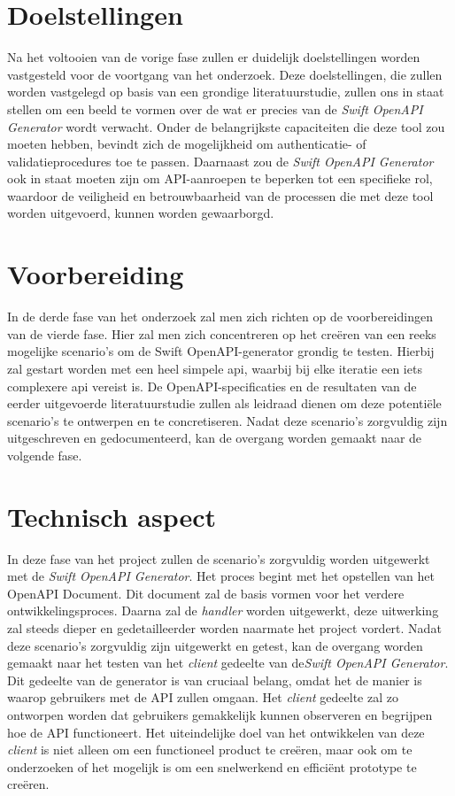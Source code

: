 \section{Doelstellingen}
Na het voltooien van de vorige fase zullen er duidelijk doelstellingen worden vastgesteld voor de voortgang van het onderzoek. Deze doelstellingen, die zullen worden vastgelegd op basis van een grondige literatuurstudie, zullen ons in staat stellen om een beeld te vormen over de wat er precies van de \textit{Swift OpenAPI Generator} wordt verwacht. Onder de belangrijkste capaciteiten die deze tool zou moeten hebben, bevindt zich de mogelijkheid om authenticatie- of validatieprocedures toe te passen. Daarnaast zou de \textit{Swift OpenAPI Generator} ook in staat moeten zijn om API-aanroepen te beperken tot een specifieke rol, waardoor de veiligheid en betrouwbaarheid van de processen die met deze tool worden uitgevoerd, kunnen worden gewaarborgd.

\section{Voorbereiding}
In de derde fase van het onderzoek zal men zich richten op de voorbereidingen van de vierde fase. Hier zal men zich concentreren op het creëren van een reeks mogelijke scenario's om de Swift OpenAPI-generator grondig te testen. Hierbij zal gestart worden met een heel simpele api, waarbij bij elke iteratie een iets complexere api vereist is. De OpenAPI-specificaties en de resultaten van de eerder uitgevoerde literatuurstudie zullen als leidraad dienen om deze potentiële scenario's te ontwerpen en te concretiseren. Nadat deze scenario’s zorgvuldig zijn uitgeschreven en gedocumenteerd, kan de overgang worden gemaakt naar de volgende fase. 

\section{Technisch aspect}
In deze fase van het project zullen de scenario's zorgvuldig worden uitgewerkt met de \textit{Swift OpenAPI Generator}. Het proces begint met het opstellen van het OpenAPI Document. Dit document zal de basis vormen voor het verdere ontwikkelingsproces. Daarna zal de \textit{handler} worden uitgewerkt, deze uitwerking zal steeds dieper en gedetailleerder worden naarmate het project vordert.
Nadat deze scenario's zorgvuldig zijn uitgewerkt en getest, kan de overgang worden gemaakt naar het testen van het \textit{client} gedeelte van de\textit{Swift OpenAPI Generator}. Dit gedeelte van de generator is van cruciaal belang, omdat het de manier is waarop gebruikers met de API zullen omgaan. Het \textit{client} gedeelte zal zo ontworpen worden dat gebruikers gemakkelijk kunnen observeren en begrijpen hoe de API functioneert.
Het uiteindelijke doel van het ontwikkelen van deze \textit{client} is niet alleen om een functioneel product te creëren, maar ook om te onderzoeken of het mogelijk is om een snelwerkend en efficiënt prototype te creëren. 

